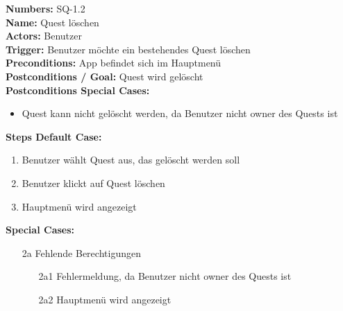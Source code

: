 \documentclass{article}
\begin{document}
\newpage
\begin{samepage}
    \textbf{Numbers:} SQ-1.2\\
    \textbf{Name:} Quest löschen\\
    \textbf{Actors:} Benutzer\\
    \textbf{Trigger:} Benutzer möchte ein bestehendes Quest löschen\\
    \textbf{Preconditions:}  App befindet sich im Hauptmenü\\
    \textbf{Postconditions / Goal:} Quest wird gelöscht \\
    \textbf{Postconditions Special Cases:} 
    \begin{itemize}
        \item Quest kann nicht gelöscht werden, da Benutzer nicht owner des Quests ist 
    \end{itemize}
    \textbf{Steps Default Case:} 
    \begin{enumerate}
        \item Benutzer wählt Quest aus, das gelöscht werden soll
        \item Benutzer klickt auf Quest löschen
        \item Hauptmenü wird angezeigt
    \end{enumerate}
    \textbf{Special Cases:}
    \begin{itemize}
        \item [2a] Fehlende Berechtigungen 
        \begin{itemize}
            \item [2a1] Fehlermeldung, da Benutzer nicht owner des Quests ist
            \item [2a2] Hauptmenü wird angezeigt
        \end{itemize}
    \end{itemize}
\end{samepage}
\end{document}
